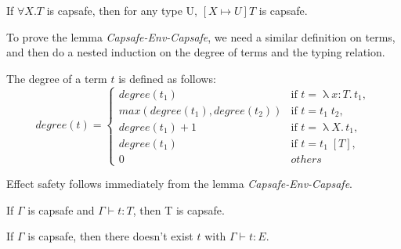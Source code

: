 \begin{lemma}
  If $\forall X.T$ is capsafe, then for any type U, $[X \mapsto U]T$
  is capsafe.
\end{lemma}

To prove the lemma \emph{Capsafe-Env-Capsafe}, we need a similar
definition on terms, and then do a nested induction on the degree of
terms and the typing relation.

\begin{definition}
  The degree of a term $t$ is defined as follows:
  \begin{equation*}
    degree(t) =
    \begin{cases}
      degree(t_1) & \text{if } t = \uplambda x{:}T. \, t_1,\\
      max(degree(t_1), degree(t_2)) & \text{if } t = t_1 \; t_2,\\
      degree(t_1) + 1 & \text{if } t = \uplambda X. \, t_1,\\
      degree(t_1) & \text{if } t = t_1 \; [T],\\
      0 & others
    \end{cases}
  \end{equation*}
\end{definition}

Effect safety follows immediately from the lemma
\emph{Capsafe-Env-Capsafe}.

\begin{lemma}
  If $\Gamma$ is capsafe and $\Gamma \vdash t : T$, then T is capsafe.
\end{lemma}

\begin{theorem}
  If $\Gamma$ is capsafe, then there doesn't exist $t$ with
  $\Gamma \vdash t : E$.
\end{theorem}
